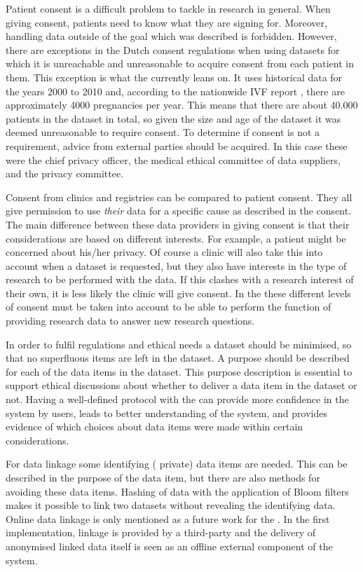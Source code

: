 Patient consent is a difficult problem to tackle in research in general.
When giving consent, patients need to know what they are signing for. Moreover, handling data outside of the goal which was described is forbidden.
However, there are exceptions in the Dutch consent regulations 
when using datasets for which it is unreachable and unreasonable to acquire consent from each patient in them.
This exception is what the \ivfsystem{} currently leans on. 
It uses historical data for the years 2000 to 2010 and, according to the nationwide IVF report \cite{ivfReportNVOG}, there are approximately 4000 pregnancies per year.
This means that there are about 40.000 patients in the dataset in total, so 
given the size and age of the dataset it was deemed unreasonable to require consent.
To determine if consent is not a requirement, advice from external parties should be acquired.
In this case these were the \AMC{} chief privacy officer, the medical ethical committee of data suppliers, and the \PRN{} privacy committee.

Consent from clinics and registries can be compared to patient consent.
They all give permission to use \emph{their} data for a specific cause as described in the consent.
The main difference between these data providers in giving consent is that their considerations are based on different interests.
For example, a patient might be concerned about his/her privacy.
Of course a clinic will also take this into account when a dataset is requested, but they also have interests in the type of research to be performed with the data.
If this clashes with a research interest of their own, it is less likely the clinic will give consent.
In the \ivfsystem{} these different levels of consent must be taken into account  to be able to perform the function of providing research data to answer new research questions.

In order to fulfil regulations and ethical needs a dataset should be minimised, so that no superfluous items are left in the dataset.
A purpose should be described for each of the data items in the dataset. 
This purpose description is essential to support ethical discussions about whether to deliver a data item in the dataset or not.
Having a well-defined protocol with the \ivfsystem{} can provide more confidence in the system by users, leads to better understanding of the system, and provides evidence of which choices about data items were made within certain considerations.

For data linkage some identifying (\ie{} private) data items are needed.
This can be described in the purpose of the data item, but there are also methods for avoiding these data items.
Hashing of data with the application of Bloom filters \cite{s22schnell2009} makes it possible to link two datasets without revealing the identifying data.
Online data linkage is only mentioned as a future work for the \ivfsystem{}.
In the first implementation, linkage is provided by a third-party and the delivery of anonymised linked data itself is seen as an offline external component of the system.

